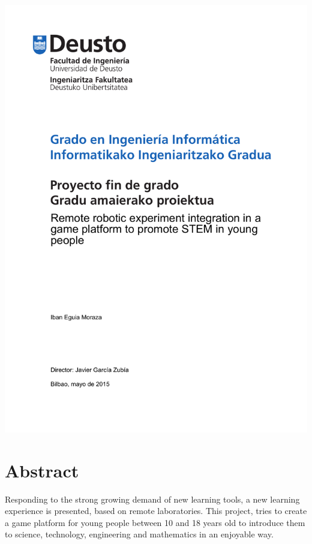 \documentclass{DeustoFDP}
\begin{document}
\frontmatter
\pagestyle{plain}

\begin{titlepage}
  \includegraphics{fig/frontpage}
  \restoregeometry
\end{titlepage}
\cleardoublepage


\chapter*{Abstract}

Responding to the strong growing demand of new learning tools, a new learning experience
is presented, based on remote laboratories. This project, tries to create a game platform
for young people between 10 and 18 years old to introduce them to science, technology,
engineering and mathematics in an enjoyable way.
\end{document}
